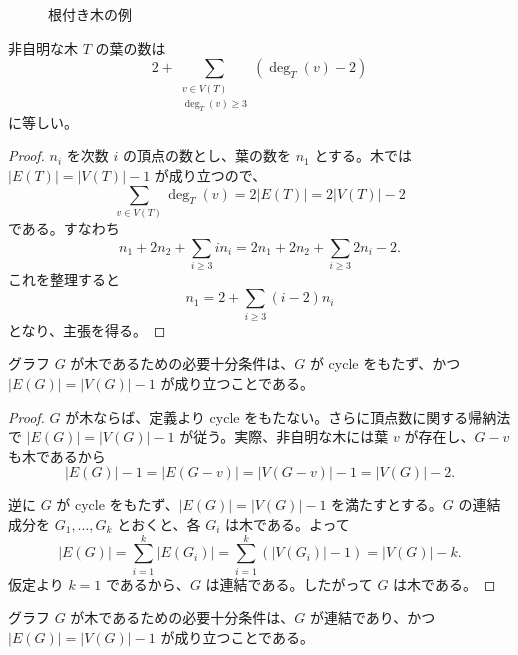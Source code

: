 \documentclass[article,paper=a4paper]{jlreq}
\begin{document}
\begin{figure}[htbp]
  \centering
  \caption{根付き木の例}
\end{figure}

\begin{prop}
  非自明な木 $T$ の葉の数は
  \[
    2+\sum_{\substack{v\in V(T)\\ \deg_T(v)\geq 3}}\left(\deg_T(v)-2\right)
  \]
  に等しい。
\end{prop}

\begin{proof}
  $n_i$ を次数 $i$ の頂点の数とし、葉の数を $n_1$ とする。木では $|E(T)|=|V(T)|-1$ が成り立つので、
  \[
    \sum_{v\in V(T)}\deg_T(v)=2|E(T)|=2|V(T)|-2
  \]
  である。すなわち
  \[
    n_1+2n_2+\sum_{i\geq3} i n_i
    =
    2n_1+2n_2+\sum_{i\geq3}2n_i-2.
  \]
  これを整理すると
  \[
    n_1=2+\sum_{i\geq3}(i-2)n_i
  \]
  となり、主張を得る。
\end{proof}

\begin{prop}
  グラフ $G$ が木であるための必要十分条件は、$G$ が cycle をもたず、かつ $|E(G)|=|V(G)|-1$ が成り立つことである。
\end{prop}

\begin{proof}
  $G$ が木ならば、定義より cycle をもたない。さらに頂点数に関する帰納法で $|E(G)|=|V(G)|-1$ が従う。実際、非自明な木には葉 $v$ が存在し、$G-v$ も木であるから
  \[
    |E(G)|-1=|E(G-v)|=|V(G-v)|-1=|V(G)|-2.
  \]

  逆に $G$ が cycle をもたず、$|E(G)|=|V(G)|-1$ を満たすとする。$G$ の連結成分を $G_1,\ldots,G_k$ とおくと、各 $G_i$ は木である。よって
  \[
    |E(G)|=\sum_{i=1}^k |E(G_i)|
    =\sum_{i=1}^k \left(|V(G_i)|-1\right)
    =|V(G)|-k.
  \]
  仮定より $k=1$ であるから、$G$ は連結である。したがって $G$ は木である。
\end{proof}

\begin{prop}
  グラフ $G$ が木であるための必要十分条件は、$G$ が連結であり、かつ $|E(G)|=|V(G)|-1$ が成り立つことである。
\end{prop}
\end{document}
